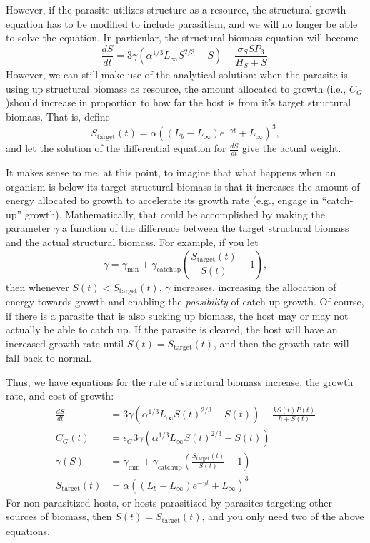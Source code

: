 \documentclass[12pt,reqno,final,pdftex]{amsart}\usepackage[]{graphicx}\usepackage[]{color}
\theoremstyle{plain}
\numberwithin{equation}{part}
\begin{document}
However, if the parasite utilizes structure as a resource, the structural growth equation has to be modified to include parasitism, and we will no longer be able to solve the equation.
In particular, the structural biomass equation will become
\begin{equation}
\frac{dS}{dt}=3\gamma  \left(\alpha^{1/3}L_{\infty }S^{2/3}-S\right)-\frac{\sigma_S S P_3}{H_S+S}.
\end{equation}
However, we can still make use of the analytical solution: when the parasite is using up structural biomass as resource, the amount allocated to growth (i.e., $C_G$)should increase in proportion to how far the host is from it's target structural biomass.
That is, define
\begin{equation}
S_{\text{target}}(t)=\alpha \left(\left(L_b-L_{\infty }\right) e^{-\gamma  t}+L_{\infty }\right)^3,
\end{equation} and let the solution of the differential equation for $\frac{dS}{dt}$ give the actual weight.

It makes sense to me, at this point, to imagine that what happens when an organism is below its target structural biomass is that it increases the amount of energy allocated to growth to accelerate its growth rate (e.g., engage in ``catch-up'' growth).
Mathematically, that could be accomplished by making the parameter $\gamma$ a function of the difference between the target structural biomass and the actual structural biomass.
For example, if you let
\begin{equation}
\gamma =\gamma _{\min }+\gamma _{\text{catchup}}\left(\frac{S_{\text{target}}(t)}{S(t)}-1\right),
\end{equation}
then whenever $S(t)<S_{\text{target}}(t)$, $\gamma$ increases, increasing the allocation of energy towards growth and enabling the \textit{possibility} of catch-up growth.
Of course, if there is a parasite that is also sucking up biomass, the host may or may not actually be able to catch up.
If the parasite is cleared, the host will have an increased growth rate until $S(t)=S_{\text{target}}(t)$, and then the growth rate will fall back to normal.

Thus, we have equations for the rate of structural biomass increase, the growth rate, and cost of growth:
\begin{align}
\frac{dS}{dt} &= 3\gamma  \left(\alpha^{1/3}L_{\infty }S(t)^{2/3}-S(t)\right)-\frac{k S(t) P(t)}{h+S(t)} \\
C_G(t)&=\epsilon_G 3\gamma \left(\alpha^{1/3}L_{\infty }S(t)^{2/3}-S(t)\right) \\
\gamma(S) &=\gamma_{\min}+\gamma_{\text{catchup}}\left(\frac{S_{\text{target}}(t)}{S(t)}-1\right) \\
S_{\text{target}}(t) &=\alpha \left(\left(L_b-L_{\infty }\right) e^{-\gamma  t}+L_{\infty }\right)^3
\end{align}
For non-parasitized hosts, or hosts parasitized by parasites targeting other sources of biomass, then $S(t)=S_{\text{target}}(t)$, and you only need two of the above equations.
\end{document}
